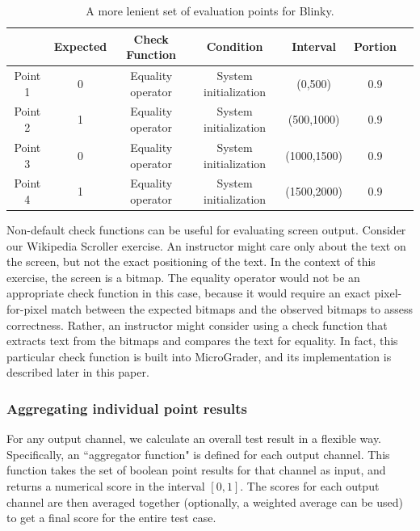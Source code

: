 \documentclass[12pt]{article}
\begin{document}
\begin{table}[ht]
\begin{center}
\caption{A more lenient set of evaluation points for Blinky.}
\vspace{2mm}
\label{table:blinky-lenient-points}
\begin{tabular}{c|cccccc}
& Expected & Check Function & Condition & Interval & Portion \\ \hline
Point 1 & 0 & Equality operator & System initialization & (0,500) & 0.9 \\
Point 2 & 1 & Equality operator & System initialization & (500,1000) & 0.9 \\
Point 3 & 0 & Equality operator & System initialization & (1000,1500) & 0.9 \\
Point 4 & 1 & Equality operator & System initialization & (1500,2000) & 0.9 \\ \hline
\end{tabular}
\end{center}
\end{table}

Non-default check functions can be useful for evaluating screen output.  Consider our Wikipedia Scroller exercise.  An instructor might care only about the text on the screen, but not the exact positioning of the text.  In the context of this exercise, the screen is a bitmap.  The equality operator would not be an appropriate check function in this case, because it would require an exact pixel-for-pixel match between the expected bitmaps and the observed bitmaps to assess correctness.  Rather, an instructor might consider using a check function that extracts text from the bitmaps and compares the text for equality.  In fact, this particular check function is built into MicroGrader, and its implementation is described later in this paper.

\subsubsection{Aggregating individual point results}
\label{sec:aggregating}
For any output channel, we calculate an overall test result in a flexible way.  Specifically, an ``aggregator function" is defined for each output channel.  This function takes the set of boolean point results for that channel as input, and returns a numerical score in the interval $[0,1]$.  The scores for each output channel are then averaged together (optionally, a weighted average can be used) to get a final score for the entire test case.
\end{document}
